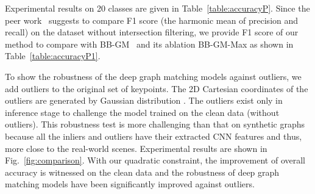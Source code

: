 \documentclass[final]{cvpr}
\begin{document}
\begin{table*}[t!]
\centering
{}
\vspace{-1mm}
   \caption{F1 score (\%) of matching and mean over 20 classes on Pascal VOC.}
   \label{table:accuracyP1}
    \vspace{-2mm}
\end{table*}

Experimental results on 20 classes are given in Table~\ref{table:accuracyP}. Since the peer work~\cite{rolinek2020deep} suggests to compare F1 score (the harmonic mean of precision and recall) on the dataset without intersection filtering, we provide F1 score of our method to compare with BB-GM~\cite{rolinek2020deep} and its ablation BB-GM-Max as shown in Table~\ref{table:accuracyP1}.

To show the robustness of the deep graph matching models against outliers, we add outliers to the original set of keypoints. The 2D Cartesian coordinates of the outliers are generated by Gaussian distribution . The outliers exist only in inference stage to challenge the model trained on the clean data (without outliers). This robustness test is more challenging than that on synthetic graphs because all the inliers and outliers have their extracted CNN features and thus, more close to the real-world scenes. Experimental results are shown in Fig.~\ref{fig:comparison}. With our quadratic constraint, the improvement of overall accuracy is witnessed on the clean data and the robustness of deep graph matching models have been significantly improved against outliers.
\end{document}
